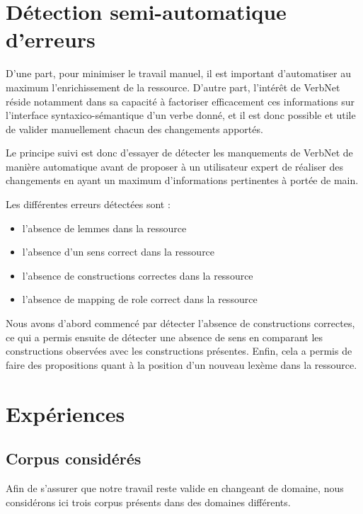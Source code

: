 \section{Détection semi-automatique d'erreurs}

D'une part, pour minimiser le travail manuel, il est important d'automatiser au
maximum l'enrichissement de la ressource. D'autre part, l'intérêt de VerbNet
réside notamment dans sa capacité à factoriser efficacement ces informations
sur l'interface syntaxico-sémantique d'un verbe donné, et il est donc possible
et utile de valider manuellement chacun des changements apportés.

Le principe suivi est donc d'essayer de détecter les manquements de VerbNet de
manière automatique avant de proposer à un utilisateur expert de réaliser des
changements en ayant un maximum d'informations pertinentes à portée de main.

Les différentes erreurs détectées sont :
\begin{itemize}
    \item l'absence de lemmes dans la ressource
    \item l'absence d'un sens correct dans la ressource
    \item l'absence de constructions correctes dans la ressource
    \item l'absence de mapping de role correct dans la ressource
\end{itemize}

Nous avons d'abord commencé par détecter l'absence de constructions correctes,
ce qui a permis ensuite de détecter une absence de sens en comparant les
constructions observées avec les constructions présentes. Enfin, cela a permis
de faire des propositions quant à la position d'un nouveau lexème dans la
ressource.

\section{Expériences}


\subsection{Corpus considérés}

Afin de s'assurer que notre travail reste valide en changeant de domaine, nous
considérons ici trois corpus présents dans des domaines différents.

